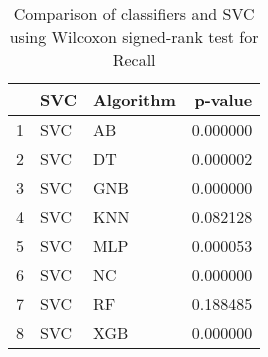 \begin{table}
\footnotesize
\caption{Comparison of classifiers and SVC using Wilcoxon signed-rank test for Recall}
\label{tab:SVC wilcoxon Recall comparison}
\begin{tabular}{lllr}
\hline
 & SVC & Algorithm & p-value \\
\hline
1 & SVC & AB & 0.000000 \\
2 & SVC & DT & 0.000002 \\
3 & SVC & GNB & 0.000000 \\
4 & SVC & KNN & 0.082128 \\
5 & SVC & MLP & 0.000053 \\
6 & SVC & NC & 0.000000 \\
7 & SVC & RF & 0.188485 \\
8 & SVC & XGB & 0.000000 \\
\hline
\end{tabular}
\end{table}
